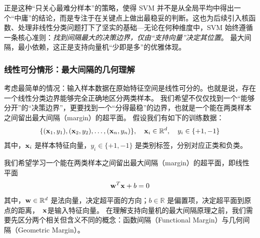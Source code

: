 正是这种“只关心最难分样本”的策略，使得 SVM 并不是从全局平均中得出一个“中庸”的结论，而是专注于在关键点上做出最稳妥的判断。这也为后续引入核函数、处理非线性分类问题打下了坚实的基础---无论在何种维度中，SVM 始终遵循一条核心准则：\emph{找到间隔最大的决策边界，仅由“支持向量”决定其位置}。
最大间隔，最小依赖，这正是支持向量机“少即是多”的优雅体现。
\subsubsection{线性可分情形：最大间隔的几何理解}


考虑最简单的情况：输入样本数据在原始特征空间是线性可分的。也就是说，存在一个线性分类边界能够完全正确地区分两类样本。
我们希望不仅仅找到一个“能够分开”的“决策边界”，更要找到一个“分得最稳”的边界，也就是一个能在两类样本之间留出最大间隔（margin）的超平面。
假设我们有如下的训练数据：
\[
\{({\bf x}_1, y_1), ({\bf x}_2, y_2), \dots, ({\bf x}_n, y_n)\}, \quad {\bf x}_i \in \mathbb{R}^d, \quad y_i \in \{+1, -1\}
\]
其中，${\bf x}_i$ 是样本特征向量，$y_i\in \{+1, -1\}$ 是类别标签，分别对应正类和负类。


我们希望学习一个能在两类样本之间留出最大间隔（margin）的超平面，即线性平面
\begin{equation}\label{hyper_plane}
{\bf w}^T {\bf x} + b  = 0
\end{equation}
其中，${\bf w} \in \mathbb{R}^d$ 是法向量，决定超平面的方向；$b \in \mathbb{R}$ 是偏置项，决定超平面到原点的距离，~${\bf x}$是输入特征向量。
在理解支持向量机的最大间隔原理之前，我们需要先区分两个相关但含义不同的概念：函数间隔（Functional Margin）与几何间隔（Geometric Margin）。

